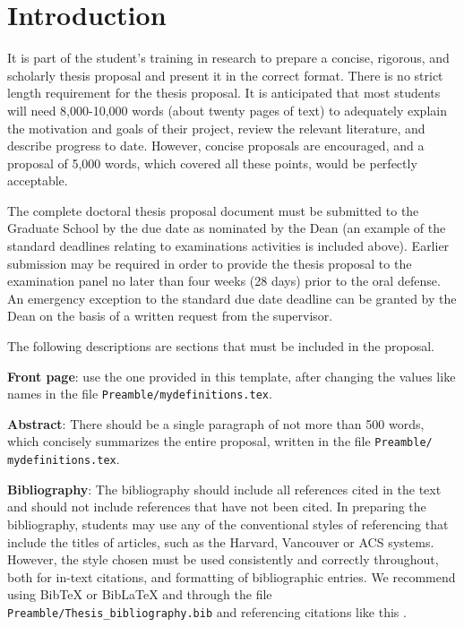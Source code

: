 
\chapter{Introduction} \label{ch-1}

It is part of the student's training in research to prepare a concise, rigorous, and scholarly thesis proposal and present it in the correct format. There is no strict length requirement for the thesis proposal. It is anticipated that most students will need 8,000-10,000 words (about twenty pages of text) to adequately explain the motivation and goals of their project, review the relevant literature, and describe progress to date. However, concise proposals are encouraged, and a proposal of 5,000 words, which covered all these points, would be perfectly acceptable. 

The complete doctoral thesis proposal document must be submitted to the Graduate School by the due date as nominated by the Dean (an example of the standard deadlines relating to examinations activities is included above). Earlier submission may be required in order to provide the thesis proposal to the examination panel no later than four weeks (28 days) prior to the oral defense. An emergency exception to the standard due date deadline can be granted by the Dean on the basis of a written request from the supervisor.

The following descriptions are sections that must be included in the proposal.

\textbf{Front page}: use the one provided in this template, after changing the values like names in the file \texttt{Preamble/mydefinitions.tex}.

\textbf{Abstract}: There should be a single paragraph of not more than 500 words, which concisely summarizes the entire proposal, written in the file \texttt{Preamble/ mydefinitions.tex}.

\textbf{Bibliography}: The bibliography should include all references cited in the text and should not include references that have not been cited. In preparing the bibliography, students may use any of the conventional styles of referencing that include the titles of articles, such as the Harvard, Vancouver or ACS systems. However, the style chosen must be used consistently and correctly throughout, both for in-text citations, and formatting of bibliographic entries. We recommend using BibTeX or BibLaTeX and through the file \texttt{Preamble/Thesis\_bibliography.bib} and referencing citations like this \cite{Lee98, Muc10, Kra27}. 

